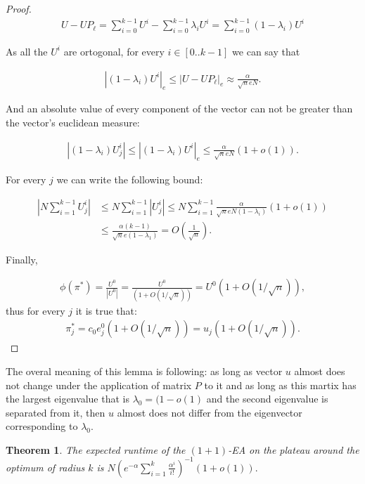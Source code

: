 \documentclass{article}
\newtheorem{theorem}{Theorem}
\begin{document}
\begin{proof}
\begin{align*}
  U - UP_\ell = \sum\limits_{i = 0}^{k - 1} U^i - \sum\limits_{i = 0}^{k - 1} \lambda_i U^i = \sum\limits_{i = 0}^{k - 1} (1 - \lambda_i) U^i
\end{align*}

As all the $U^i$ are ortogonal, for every $i \in [0..k - 1]$ we can say that

\begin{align*}
  |(1 - \lambda_i) U^i|_e \le |U - UP_\ell|_e \approx \frac{\alpha}{\sqrt{n} e N}.
\end{align*}

And an absolute value of every component of the vector can not be greater than the vector's euclidean measure:

\begin{align*}
  |(1 - \lambda_i) U_j^i| \le |(1 - \lambda_i) U^i|_e \le \frac{\alpha}{\sqrt{n} e N} (1 + o(1)).
\end{align*}

For every $j$ we can write the following bound:

\begin{align*}
  |N\sum\limits_{i = 1}^{k - 1} U_j^i| &\le N\sum\limits_{i = 1}^{k - 1} |U_j^i| \le N\sum\limits_{i = 1}^{k - 1} \frac{\alpha}{\sqrt{n} e N (1 - \lambda_i)} (1 + o(1)) \\
  & \le \frac{\alpha (k - 1)}{\sqrt{n}e (1 - \lambda_1)} = O\left(\frac{1}{\sqrt{n}}\right).
\end{align*}

Finally,

\begin{align*}
  \phi(\pi^*) = \frac{U^0}{|U^0|} = \frac{U^0}{(1 + O(1/\sqrt{n}))} = U^0 (1 + O(1/\sqrt{n})),
\end{align*}
thus for every $j$ it is true that:
\begin{align*}
  \pi_j^* = c_0 e_j^0 (1 + O(1/\sqrt{n})) = u_j (1 + O(1/\sqrt{n})).
\end{align*}


\end{proof}

The overal meaning of this lemma is following: as long as vector $u$ almost does not change under the application of matrix $P$ to it and as long as this martix has the largest eigenvalue that is $\lambda_0 = (1 - o(1)$ and the second eigenvalue is separated from it, then $u$ almost does not differ from the eigenvector corresponding to $\lambda_0$.

\begin{theorem}
  The expected runtime of the $(1 + 1)$-EA on the plateau around the optimum of radius $k$ is $N \left( e^{-\alpha} \sum\limits_{i = 1}^k \frac{\alpha^i}{i!}\right)^{-1} (1 + o(1)).$
\end{theorem}
\end{document}
